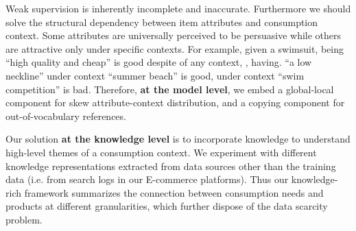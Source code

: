 \documentclass[sigconf]{acmart}
\begin{document}
Weak supervision is inherently incomplete and inaccurate.
Furthermore we should solve the structural dependency between item attributes and consumption context. Some attributes are universally perceived to be persuasive while others are attractive only under specific contexts. For example, given a swimsuit, being ``high quality and cheap'' is good despite of any context, , having. ``a low neckline'' under context ``summer beach'' is good, under context ``swim competition'' is bad. 
Therefore, \textbf{at the model level}, we embed a global-local component for skew attribute-context distribution, and a copying component for out-of-vocabulary references.

Our solution \textbf{at the knowledge level} is to incorporate knowledge to understand high-level themes of a consumption context. 
We experiment with different knowledge representations extracted from data sources other than the training data (i.e. from search logs in our E-commerce platforms).
Thus our knowledge-rich framework summarizes the connection between consumption needs and products at different granularities, which further dispose of the data scarcity problem.
\end{document}
